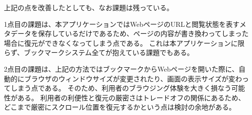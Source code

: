 上記の点を改善したとしても、なお課題は残っている。

1点目の課題は、本アプリケーションではWebページのURLと閲覧状態を表すメタデータを保存しているだけであるため、ページの内容が書き換わってしまった場合に復元ができなくなってしまう点である。
これは本アプリケーションに限らず、ブックマークシステム全てが抱えている課題でもある。

2点目の課題は、上記の方法ではブックマークからWebページを開いた際に、自動的にブラウザのウィンドウサイズが変更されたり、画面の表示サイズが変わってしまう点である。
そのため、利用者のブラウジング体験を大きく損なう可能性がある。
利用者の利便性と復元の厳密さはトレードオフの関係にあるため、どこまで厳密にスクロール位置を復元するかという点は検討の余地がある。